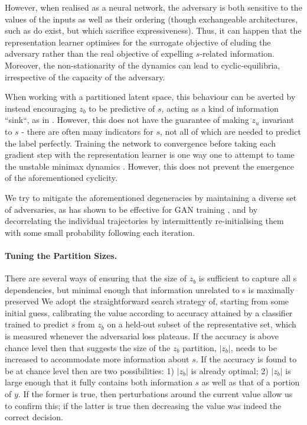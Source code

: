 However, when realised as a neural network, the adversary is both sensitive to the values of the inputs as well as their ordering (though exchangeable architectures, such as \citet{zaheer2017deep} do exist, but which sacrifice expressiveness).
Thus, it can happen that the representation learner optimises for the surrogate objective of eluding the adversary rather than the real objective of expelling $s$-related information.
Moreover, the non-stationarity of the dynamics can lead to cyclic-equilibria, irrespective of the capacity of the adversary.

When working with a partitioned latent space, this behaviour can be averted by instead encouraging $z_b$ to be predictive of $s$, acting as a kind of information ``sink``, as in \citet{JacSmeOya18}.
However, this does not have the guarantee of making $z_u$ invariant to $s$ - there are often many indicators for $s$, not all of which are needed to predict the label perfectly.
Training the network to convergence before taking each gradient step with the representation learner is one way one to attempt to tame the unstable minimax dynamics \citep{feng2019learning}.
However, this does not prevent the emergence of the aforementioned cyclicity.

We try to mitigate the aforementioned degeneracies by maintaining a diverse set of adversaries, as has shown to be effective for GAN training \citep{durugkar2016generative}, and by decorrelating the individual trajectories by intermittently re-initialising them with some small probability following each iteration.

\paragraph{Tuning the Partition Sizes.}
There are several ways of ensuring that the size of $z_b$ is sufficient to capture all s dependencies, but minimal enough that information unrelated to s is maximally preserved
We adopt the straightforward search strategy of, starting from some initial guess, calibrating the value according to accuracy attained by a classifier trained to predict $s$ from $z_b$ on a held-out subset of the representative set, which is measured whenever the adversarial loss plateaus. If the accuracy is above chance level then that suggests the size of the $z_b$ partition, $|z_b|$, needs to be increased to accommodate more information about $s$. If the accuracy is found to be at chance level then are two possibilities: 1) $|z_b|$ is already optimal; 2) $|z_b|$ is large enough that it fully contains both information $s$ as well as that of a portion of $y$. If the former is true, then perturbations around the current value allow us to confirm this; if the latter is true then decreasing the value was indeed the correct decision.

